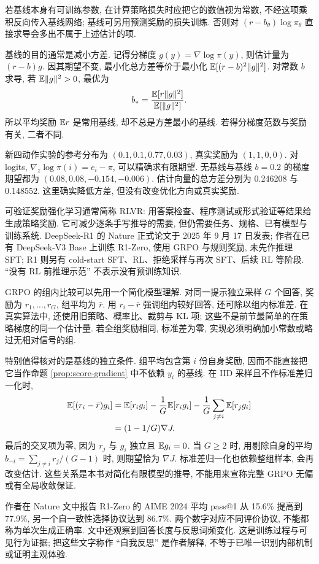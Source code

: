 若基线本身有可训练参数, 在计算策略损失时应把它的数值视为常数, 不经这项乘积反向传入基线网络; 基线可另用预测奖励的损失训练. 否则对 $(r-b_\theta)\log\pi_\theta$ 直接求导会多出不属于上述估计的项.

基线的目的通常是减小方差. 记得分梯度 $g(y)=\nabla\log\pi(y)$, 则估计量为 $(r-b)g$. 因其期望不变, 最小化总方差等价于最小化 $\mathbb E[(r-b)^2\lVert g\rVert^2]$. 对常数 $b$ 求导, 若 $\mathbb E\lVert g\rVert^2>0$, 最优为
\[
b_* =\frac{\mathbb E[r\lVert g\rVert^2]}{\mathbb E[\lVert g\rVert^2]}.
\]
所以平均奖励 $\mathbb E r$ 是常用基线, 却不总是方差最小的基线. 若得分梯度范数与奖励有关, 二者不同.

新四动作实验的参考分布为 $(0.1,0.1,0.77,0.03)$, 真实奖励为 $(1,1,0,0)$. 对 logits, $\nabla_z\log\pi(i)=e_i-\pi$, 可以精确求有限期望. 无基线与基线 $b=0.2$ 的梯度期望都为 $(0.08,0.08,-0.154,-0.006)$. 估计向量的总方差分别为 0.246208 与 0.148552. 这里确实降低方差, 但没有改变优化方向或真实奖励.

\label{sec:reason-rlvr}
可验证奖励强化学习通常简称 RLVR: 用答案检查、程序测试或形式验证等结果给生成策略奖励. 它可减少逐条手写推导的需要, 但仍需要任务、规格、已有模型与训练系统. DeepSeek-R1 的 Nature 正式论文于 2025 年 9 月 17 日发表; 作者在已有 DeepSeek-V3 Base 上训练 R1-Zero, 使用 GRPO 与规则奖励, 未先作推理 SFT; R1 则另有 cold-start SFT、RL、拒绝采样与再次 SFT、后续 RL 等阶段\cite{r1nature}. ``没有 RL 前推理示范'' 不表示没有预训练知识.

GRPO 的组内比较可以先用一个简化模型理解. 对同一提示独立采样 $G$ 个回答, 奖励为 $r_1,\ldots,r_G$, 组平均为 $\bar r$. 用 $r_i-\bar r$ 强调组内较好回答, 还可除以组内标准差. 在真实算法中, 还使用旧策略、概率比、裁剪与 KL 项; 这些不是前节最简单的在策略梯度的同一个估计量. 若全组奖励相同, 标准差为零, 实现必须明确加小常数或略过无相对信号的组.

特别值得核对的是基线的独立条件. 组平均包含第 $i$ 份自身奖励, 因而不能直接把它当作命题 \ref{prop:score-gradient} 中不依赖 $y_i$ 的基线. 在 IID 采样且不作标准差归一化时,
\begin{align*}
\mathbb E[(r_i-\bar r)g_i]
&=\mathbb E[r_ig_i]-\frac1G\mathbb E[r_ig_i]
 -\frac1G\sum_{j\ne i}\mathbb E[r_jg_i]\\
&=(1-1/G)\nabla J.
\end{align*}
最后的交叉项为零, 因为 $r_j$ 与 $g_i$ 独立且 $\mathbb E g_i=0$. 当 $G\ge2$ 时, 用剔除自身的平均 $b_{-i}=\sum_{j\ne i}r_j/(G-1)$ 时, 则期望恰为 $\nabla J$. 标准差归一化也依赖整组样本, 会再改变估计. 这些关系是本书对简化有限模型的推导, 不能用来宣称完整 GRPO 无偏或有全局收敛保证.

作者在 Nature 文中报告 R1-Zero 的 AIME 2024 平均 pass@1 从 15.6\% 提高到 77.9\%, 另一个自一致性选择协议达到 86.7\%\cite{r1nature}. 两个数字对应不同评价协议, 不能都称为单次生成正确率. 文中还观察到回答长度与反思词频变化. 这是训练过程与可见行为证据; 把这些文字称作 ``自我反思'' 是作者解释, 不等于已唯一识别内部机制或证明主观体验.

